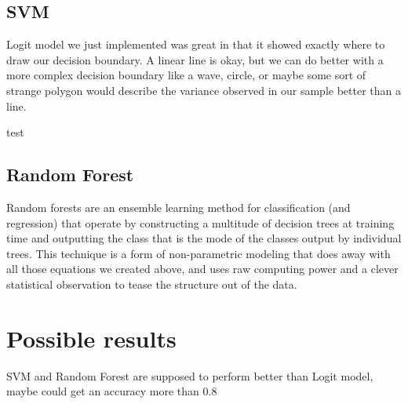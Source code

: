 \documentclass{article}
\begin{document}
\subsection{SVM}

Logit model we just implemented was great in that it showed exactly where to draw our decision boundary. A linear line is okay, but we can do better with a more complex decision boundary like a wave, circle, or maybe some sort of strange polygon would describe the variance observed in our sample better than a line.

test

\subsection{Random Forest}
Random forests are an ensemble learning method for classification (and regression) that operate by constructing a multitude of decision trees at training time and outputting the class that is the mode of the classes output by individual trees. This technique is a form of non-parametric modeling that does away with all those equations we created above, and uses raw computing power and a clever statistical observation to tease the structure out of the data.



\section{Possible results}

SVM and Random Forest are supposed to perform better than Logit model, maybe could get an accuracy more than 0.8
\end{document}
